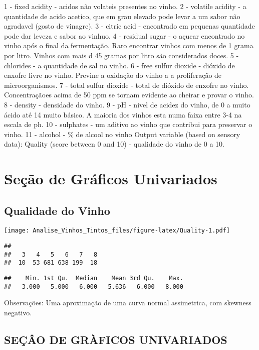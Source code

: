 \documentclass[]{article}
\begin{document}
1 - fixed acidity - acidos não volateis presentes no vinho. 2 - volatile
acidity - a quantidade de acido acetico, que em grau elevado pode levar
a um sabor não agradavel (gosto de vinagre). 3 - citric acid -
encontrado em pequenas quantidade pode dar leveza e sabor ao vinhuo. 4 -
residual sugar - o açucar encontrado no vinho após o final da
fermentação. Raro encontrar vinhos com menos de 1 grama por litro.
Vinhos com mais d 45 gramas por litro são considerados doces. 5 -
chlorides - a quantidade de sal no vinho. 6 - free sulfur dioxide -
dióxido de enxofre livre no vinho. Previne a oxidação do vinho a a
proliferação de microorganismos. 7 - total sulfur dioxide - total de
dióxido de enxofre no vinho. Concentraçãoes acima de 50 ppm se tornam
evidente ao cheirar e provar o vinho. 8 - density - densidade do vinho.
9 - pH - nivel de acidez do vinho, de 0 a muito ácido até 14 muito
básico. A maioria dos vinhos esta numa faixa entre 3-4 na escala de ph.
10 - sulphates - um aditivo ao vinho que contribui para preservar o
vinho. 11 - alcohol - \% de alcool no vinho Output variable (based on
sensory data): Quality (score between 0 and 10) - qualidade do vinho de
0 a 10.

\hypertarget{secao-de-graficos-univariados}{%
\section{Seção de Gráficos
Univariados}\label{secao-de-graficos-univariados}}

\hypertarget{qualidade-do-vinho}{%
\subsection{Qualidade do Vinho}\label{qualidade-do-vinho}}

\texttt{[image: Analise\_Vinhos\_Tintos\_files/figure-latex/Quality-1.pdf]}

\begin{verbatim}
## 
##   3   4   5   6   7   8 
##  10  53 681 638 199  18
\end{verbatim}

\begin{verbatim}
##    Min. 1st Qu.  Median    Mean 3rd Qu.    Max. 
##   3.000   5.000   6.000   5.636   6.000   8.000
\end{verbatim}

Observações: Uma aproximação de uma curva normal assimetrica, com
skewness negativo.

\hypertarget{secao-de-graficos-univariados}{%
\subsection{SEÇÂO DE GRÀFICOS
UNIVARIADOS}\label{secao-de-graficos-univariados}}
\end{document}
